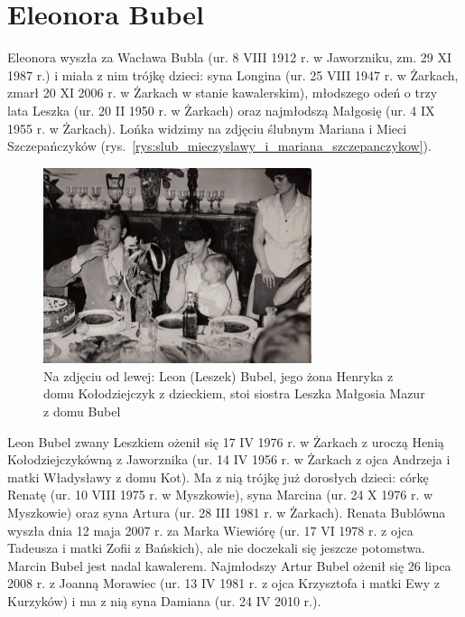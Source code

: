 \section{Eleonora Bubel}

Eleonora wyszła za Wacława Bubla (ur. 8 VIII 1912 r. w Jaworzniku, zm. 29 XI 1987 r.) i miała z nim trójkę dzieci: syna Longina (ur. 25 VIII 1947 r. w Żarkach, zmarł 20 XI 2006 r. w Żarkach w stanie kawalerskim), młodszego odeń o trzy lata Leszka (ur. 20 II 1950 r. w Żarkach) oraz najmłodszą Małgosię (ur. 4 IX 1955 r. w Żarkach). Lońka widzimy na zdjęciu ślubnym Mariana i Mieci Szczepańczyków (rys.~\ref{rys:slub_mieczyslawy_i_mariana_szczepanczykow}).

\begin{figure}[!h]
\begin{center}
\includegraphics[width=0.7\textwidth]{zdjecia/leon_henryka_malgosia_bubel.jpg}
\caption[Leon, Henryka i Małgorzata Bublowie]{Na zdjęciu od lewej: Leon (Leszek) Bubel, jego żona Henryka z domu Kołodziejczyk z dzieckiem, stoi siostra Leszka Małgosia Mazur z domu Bubel}
\label{rys:leon_henryka_malgosia_bubel}
\end{center}
\end{figure}

Leon Bubel zwany Leszkiem ożenił się 17 IV 1976 r. w Żarkach z uroczą Henią Kołodziejczykówną z Jaworznika (ur. 14 IV 1956 r. w Żarkach z ojca Andrzeja i matki Władysławy z domu Kot). Ma z nią trójkę już dorosłych dzieci: córkę Renatę (ur. 10 VIII 1975 r. w Myszkowie), syna Marcina (ur. 24 X 1976 r. w Myszkowie) oraz syna Artura (ur. 28 III 1981 r. w Żarkach). Renata Bublówna wyszła dnia 12 maja 2007 r.
za Marka Wiewiórę (ur. 17 VI 1978 r. z ojca Tadeusza i matki Zofii z Bańskich), ale nie doczekali się jeszcze potomstwa. Marcin Bubel jest nadal kawalerem. Najmłodszy Artur Bubel ożenił się 26 lipca 2008 r. z Joanną Morawiec (ur. 13 IV 1981 r. z ojca Krzysztofa i matki Ewy z Kurzyków) i ma z nią syna Damiana (ur. 24 IV 2010 r.).

